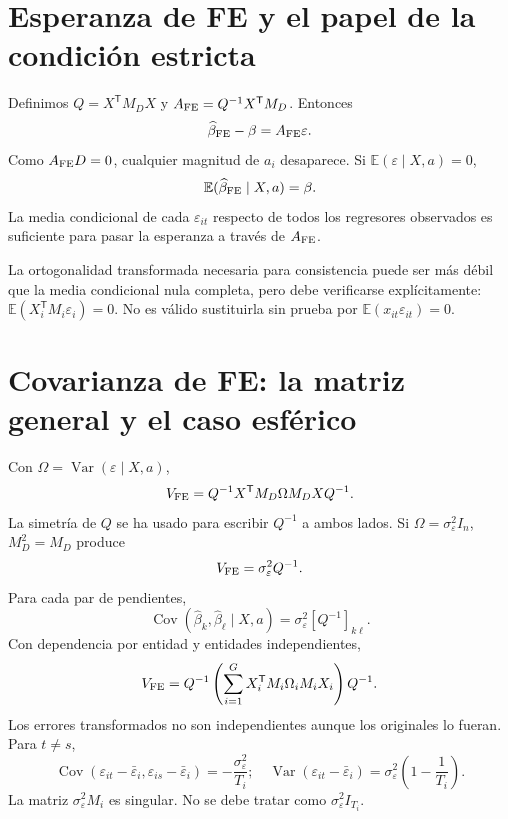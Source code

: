 \documentclass[11pt,a4paper]{article}
\newcommand{\E}{\mathbb E}
\newcommand{\T}{^{\mathsf T}}
\DeclareMathOperator{\Var}{Var}
\DeclareMathOperator{\Cov}{Cov}
\theoremstyle{definition}
\newcommand{\eps}{\varepsilon}
\begin{document}
\section{Esperanza de FE y el papel de la condición estricta}
Definimos $Q=X\T M_DX$ y $A_{\rm FE}=Q^{-1}X\T M_D$. Entonces
\[
\widehat\beta_{\rm FE}-\beta=A_{\rm FE}\eps.
\]
Como $A_{\rm FE}D=0$, cualquier magnitud de $a_i$ desaparece. Si
$\E(\eps\mid X,a)=0$,
\[
\E(\widehat\beta_{\rm FE}\mid X,a)=\beta.
\]
La media condicional de cada $\eps_{it}$ respecto de todos los regresores observados es suficiente para pasar la esperanza a través de $A_{\rm FE}$.

La ortogonalidad transformada necesaria para consistencia puede ser más débil que la media condicional nula completa, pero debe verificarse explícitamente:
$\E(X_i\T M_i\eps_i)=0$.
No es válido sustituirla sin prueba por $\E(x_{it}\eps_{it})=0$.

\section{Covarianza de FE: la matriz general y el caso esférico}
Con $\Omega=\Var(\eps\mid X,a)$,
\[
V_{\rm FE}=Q^{-1}X\T M_D\Omega M_DXQ^{-1}.
\]
La simetría de $Q$ se ha usado para escribir $Q^{-1}$ a ambos lados.
Si $\Omega=\sigma_\eps^2I_n$, $M_D^2=M_D$ produce
\[
V_{\rm FE}=\sigma_\eps^2Q^{-1}.
\]
Para cada par de pendientes,
\[
\Cov(\widehat\beta_k,\widehat\beta_\ell\mid X,a)
=\sigma_\eps^2[Q^{-1}]_{k\ell}.
\]
Con dependencia por entidad y entidades independientes,
\[
V_{\rm FE}
=Q^{-1}\left(\sum_{i=1}^G X_i\T M_i\Omega_iM_iX_i\right)Q^{-1}.
\]
Los errores transformados no son independientes aunque los originales lo fueran. Para $t\ne s$,
\[
\Cov(\eps_{it}-\bar\eps_i,\eps_{is}-\bar\eps_i)
=-\frac{\sigma_\eps^2}{T_i};
\quad
\Var(\eps_{it}-\bar\eps_i)=\sigma_\eps^2\left(1-\frac1{T_i}\right).
\]
La matriz $\sigma_\eps^2M_i$ es singular. No se debe tratar como $\sigma_\eps^2I_{T_i}$.
\end{document}
